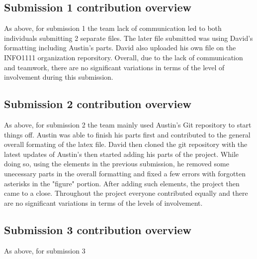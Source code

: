 \documentclass[a4paper, 11pt]{report}
\begin{document}
\subsection{Submission 1 contribution overview}

As above, for submission 1 the team lack of communication led to both individuals submitting 2 separate files. The later file submitted was using David's formatting including Austin's parts. David also uploaded his own file on the INFO1111 organization reporsitory. Overall, due to the lack of communication and teamwork, there are no significant variations in terms of the level of involvement during this submission. 
\subsection{Submission 2 contribution overview}


As above, for submission 2 the team mainly used Austin's Git repository to start things off. Austin was able to finish his parts first and contributed to the general overall formating of the latex file. David then cloned the git repository with the latest updates of Austin's then started adding his parts of the project. While doing so, using the elements in the previous submission, he removed some unecessary parts in the overall formatting and fixed a few errors with forgotten asterisks in the "figure" portion. After adding such elements, the project then came to a close. Throughout the project everyone contributed equally and there are no significant variations in terms of the levels of involvement. 

\subsection{Submission 3 contribution overview}

As above, for submission 3



\newpage



\end{document}
